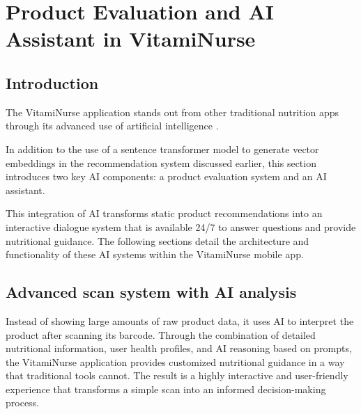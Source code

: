 

\chapter{Product Evaluation and AI Assistant in VitamiNurse}
\section*{Introduction}
The VitamiNurse application stands out from other traditional nutrition apps through its advanced use of artificial intelligence .

In addition to the use of a sentence transformer model to generate vector embeddings in the recommendation system discussed earlier, this section introduces two key AI components: a product evaluation system and an AI assistant.

This integration of AI transforms static product recommendations into an interactive dialogue system that is available 24/7 to answer questions and provide nutritional guidance. The following sections detail the architecture and functionality of these AI systems within the VitamiNurse mobile app.

\section{Advanced scan system with AI analysis }

Instead of showing large amounts of raw product data, it uses AI to interpret the product after scanning its barcode.  Through the combination of detailed nutritional information, user health profiles, and AI reasoning based on prompts, the VitamiNurse application provides customized nutritional guidance in a way that traditional tools cannot. The result is a highly interactive and user-friendly experience that transforms a simple scan into an informed decision-making process.


